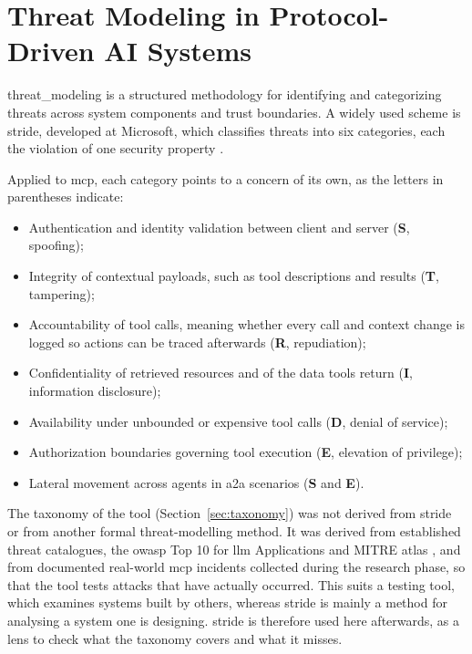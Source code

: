 \section{Threat Modeling in Protocol-Driven AI Systems}
\label{sec:threat-modeling}

\gls{threat_modeling} is a structured methodology for identifying and categorizing threats across system components and trust boundaries. A widely used scheme is \gls{stride}, developed at Microsoft, which classifies threats into six categories, each the violation of one security property \citep{shostack2014threat}.

Applied to \gls{mcp}, each category points to a concern of its own, as the letters in parentheses indicate:

\begin{itemize}
    \item Authentication and identity validation between client and server (\textbf{S}, spoofing);
    \item Integrity of contextual payloads, such as tool descriptions and results (\textbf{T}, tampering);
    \item Accountability of tool calls, meaning whether every call and context change is logged so actions can be traced afterwards (\textbf{R}, repudiation);
    \item Confidentiality of retrieved resources and of the data tools return (\textbf{I}, information disclosure);
    \item Availability under unbounded or expensive tool calls (\textbf{D}, denial of service);
    \item Authorization boundaries governing tool execution (\textbf{E}, elevation of privilege);
    \item Lateral movement across agents in \gls{a2a} scenarios (\textbf{S} and \textbf{E}).
\end{itemize}

The taxonomy of the tool (Section~\ref{sec:taxonomy}) was not derived from \gls{stride} or from another formal threat-modelling method. It was derived from established threat catalogues, the \gls{owasp} Top 10 for \gls{llm} Applications \citep{owasp2025llmtop10} and MITRE \gls{atlas} \citep{mitre2023atlas}, and from documented real-world \gls{mcp} incidents collected during the research phase, so that the tool tests attacks that have actually occurred. This suits a testing tool, which examines systems built by others, whereas \gls{stride} is mainly a method for analysing a system one is designing. \gls{stride} is therefore used here afterwards, as a lens to check what the taxonomy covers and what it misses.

